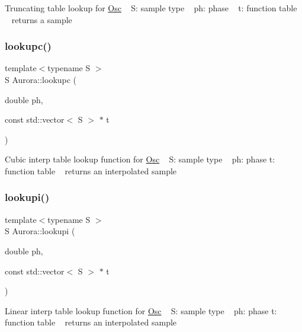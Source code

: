 Truncating table lookup for \hyperlink{class_aurora_1_1_osc}{Osc} ~\newline
S\+: sample type ~\newline
ph\+: phase ~\newline
t\+: function table ~\newline
returns a sample \mbox{\label{namespace_aurora_afab81d7b8873e7850073124fcf37eeea}} 
\subsubsection{\texorpdfstring{lookupc()}{lookupc()}}
{\footnotesize\ttfamily template$<$typename S $>$ \\
S Aurora\+::lookupc (\begin{DoxyParamCaption}\item[{double}]{ph,  }\item[{const std\+::vector$<$ S $>$ $\ast$}]{t }\end{DoxyParamCaption})\hspace{0.3cm}{\ttfamily [inline]}}

Cubic interp table lookup function for \hyperlink{class_aurora_1_1_osc}{Osc} ~\newline
S\+: sample type ~\newline
ph\+: phase  t\+: function table ~\newline
returns an interpolated sample \mbox{\label{namespace_aurora_a9246ac499667da52a0d1750e5238c4a8}} 
\subsubsection{\texorpdfstring{lookupi()}{lookupi()}}
{\footnotesize\ttfamily template$<$typename S $>$ \\
S Aurora\+::lookupi (\begin{DoxyParamCaption}\item[{double}]{ph,  }\item[{const std\+::vector$<$ S $>$ $\ast$}]{t }\end{DoxyParamCaption})\hspace{0.3cm}{\ttfamily [inline]}}

Linear interp table lookup function for \hyperlink{class_aurora_1_1_osc}{Osc} ~\newline
S\+: sample type ~\newline
ph\+: phase  t\+: function table ~\newline
returns an interpolated sample \mbox{\label{namespace_aurora_a49b6f6d92479d80271ced42627154066}} 
